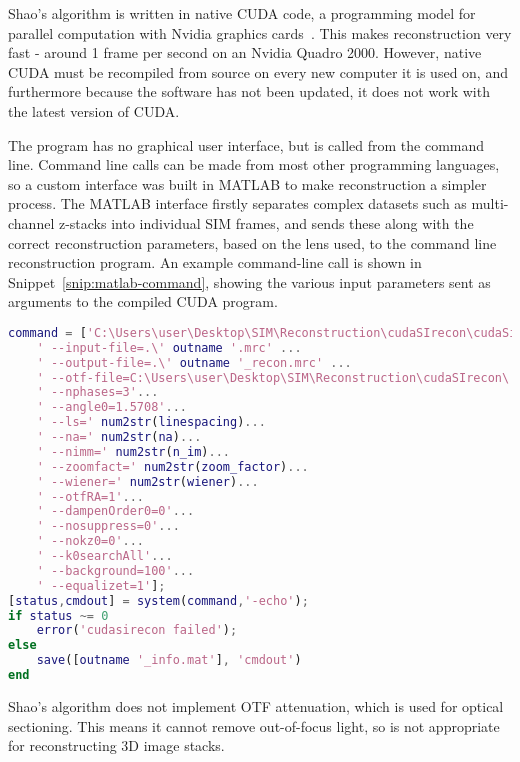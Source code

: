 Shao's algorithm is written in native CUDA code, a programming model for parallel computation with Nvidia graphics cards~\cite{sanders2010cuda}.
This makes reconstruction very fast - around 1 frame per second on an Nvidia Quadro 2000.
However, native CUDA must be recompiled from source on every new computer it is used on, and furthermore because the software has not been updated, it does not work with the latest version of CUDA.

The program has no graphical user interface, but is called from the command line.
Command line calls can be made from most other programming languages, so a custom interface was built in MATLAB to make reconstruction a simpler process.
The MATLAB interface firstly separates complex datasets such as multi-channel z-stacks into individual SIM frames, and sends these along with the correct reconstruction parameters, based on the lens used, to the command line reconstruction program.
An example command-line call is shown in Snippet~\ref{snip:matlab-command}, showing the various input parameters sent as arguments to the compiled CUDA program. 

\begin{lstfloat}
\begin{lstlisting}[language=matlab,caption={Lin Shao's CUDA reconstruction program is executed as a command line program through a MATLAB interface},label={snip:matlab-command},frame=single]
command = ['C:\Users\user\Desktop\SIM\Reconstruction\cudaSIrecon\cudaSireconDriver.exe' ...
    ' --input-file=.\' outname '.mrc' ...
    ' --output-file=.\' outname '_recon.mrc' ...
    ' --otf-file=C:\Users\user\Desktop\SIM\Reconstruction\cudaSIrecon\' otf_file '.mrc'...
    ' --nphases=3'...
    ' --angle0=1.5708'...
    ' --ls=' num2str(linespacing)...
    ' --na=' num2str(na)...
    ' --nimm=' num2str(n_im)...
    ' --zoomfact=' num2str(zoom_factor)...
    ' --wiener=' num2str(wiener)...
    ' --otfRA=1'...
    ' --dampenOrder0=0'...
    ' --nosuppress=0'...
    ' --nokz0=0'...
    ' --k0searchAll'...
    ' --background=100'...
    ' --equalizet=1'];
[status,cmdout] = system(command,'-echo');
if status ~= 0
    error('cudasirecon failed');
else
    save([outname '_info.mat'], 'cmdout')
end
\end{lstlisting}
\end{lstfloat}


Shao's algorithm does not implement OTF attenuation, which is used for optical sectioning.
This means it cannot remove out-of-focus light, so is not appropriate for reconstructing 3D image stacks.

